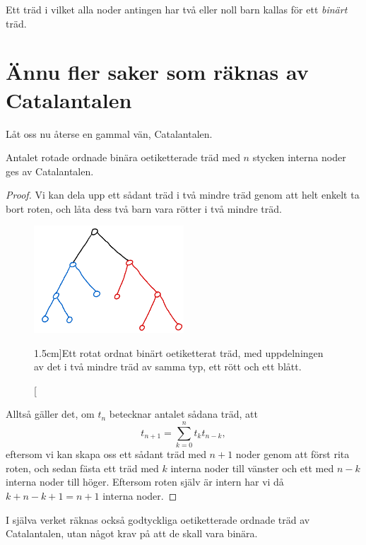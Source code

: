 \documentclass[nobib]{tufte-handout}
\begin{document}
\begin{definition}
    Ett träd i vilket alla noder antingen har två eller noll barn kallas för ett \emph{binärt} träd.
\end{definition}

\section{Ännu fler saker som räknas av Catalantalen}

Låt oss nu återse en gammal vän, Catalantalen.

\begin{proposition}
    Antalet rotade ordnade binära oetiketterade träd med $n$ stycken interna noder ges av Catalantalen.

    \begin{proof}
        Vi kan dela upp ett sådant träd i två mindre träd genom att helt enkelt ta bort roten, och låta dess två barn vara rötter i två mindre träd.

        \begin{figure}
            \centering
            \includegraphics[width=0.5\textwidth]{graphics/RUBOTree_division.png}
            \caption[][1.5cm]{Ett rotat ordnat binärt oetiketterat träd, med uppdelningen av det i två mindre träd av samma typ, ett rött och ett blått.}
        \end{figure}

        Alltså gäller det, om $t_n$ betecknar antalet sådana träd, att
        $$t_{n+1} = \sum_{k=0}^{n} t_k t_{n-k},$$
        eftersom vi kan skapa oss ett sådant träd med $n+1$ noder genom att först rita roten, och sedan fästa ett träd med $k$ interna noder till vänster och ett med $n-k$ interna noder till höger. Eftersom roten själv är intern har vi då $k + n - k + 1 = n + 1$ interna noder.
    \end{proof}
\end{proposition}

I själva verket räknas också godtyckliga oetiketterade ordnade träd av Catalantalen, utan något krav på att de skall vara binära.
\end{document}
